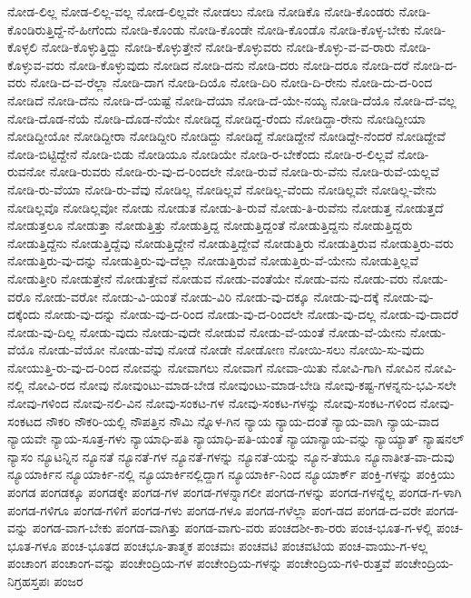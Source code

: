 ನೋಡ-ಲಿಲ್ಲ
ನೋಡ-ಲಿಲ್ಲ-ವಲ್ಲ
ನೋಡ-ಲಿಲ್ಲವೇ
ನೋಡಲು
ನೋಡಿ
ನೋಡಿಕೊ
ನೋಡಿ-ಕೊಂಡರು
ನೋಡಿ-ಕೊಂಡಿರುತ್ತಿದ್ದೆ-ನೆ-ಹೀಗೆಂದು
ನೋಡಿ-ಕೊಂಡು
ನೋಡಿ-ಕೊಂಡೇ
ನೋಡಿ-ಕೊಂಡೊ
ನೋಡಿ-ಕೊಳ್ಳ-ಬೇಕು
ನೋಡಿ-ಕೊಳ್ಳಲಿ
ನೋಡಿ-ಕೊಳ್ಳುತ್ತಿದ್ದು
ನೋಡಿ-ಕೊಳ್ಳುತ್ತೇನೆ
ನೋಡಿ-ಕೊಳ್ಳುವರು
ನೋಡಿ-ಕೊಳ್ಳು-ವ-ವ-ರಾರು
ನೋಡಿ-ಕೊಳ್ಳುವ-ವರು
ನೋಡಿ-ಕೊಳ್ಳುವುದು
ನೋಡಿದ
ನೋಡಿ-ದನು
ನೋಡಿ-ದರು
ನೋಡಿ-ದರೂ
ನೋಡಿ-ದರೆ
ನೋಡಿ-ದ-ವರು
ನೋಡಿ-ದ-ವ-ರೆಲ್ಲಾ
ನೋಡಿ-ದಾಗ
ನೋಡಿ-ದಿಯೊ
ನೋಡಿ-ದಿರಿ
ನೋಡಿ-ದಿ-ರೇನು
ನೋಡಿ-ದು-ದ-ರಿಂದ
ನೋಡಿದೆ
ನೋಡಿ-ದೆನು
ನೋಡಿ-ದೆ-ಯಷ್ಟೆ
ನೋಡಿ-ದೆಯಾ
ನೋಡಿ-ದೆ-ಯೇ-ನಯ್ಯ
ನೋಡಿ-ದೆಯೊ
ನೋಡಿ-ದೆ-ವಲ್ಲ
ನೋಡಿ-ದೊಡ-ನೆಯೆ
ನೋಡಿ-ದೊಡ-ನೆಯೇ
ನೋಡಿದ್ದ
ನೋಡಿದ್ದ-ರೆಂದು
ನೋಡಿದ್ದಾ-ರೇನು
ನೋಡಿದ್ದೀಯಾ
ನೋಡಿದ್ದೀಯೋ
ನೋಡಿದ್ದೀರಾ
ನೋಡಿದ್ದೀರಿ
ನೋಡಿದ್ದು
ನೋಡಿದ್ದೆ
ನೋಡಿದ್ದೇನೆ
ನೋಡಿದ್ದೇ-ನೆಂದರೆ
ನೋಡಿದ್ದೇವೆ
ನೋಡಿ-ಬಿಟ್ಟಿದ್ದೇನೆ
ನೋಡಿ-ಬಿಡು
ನೋಡಿಯೂ
ನೋಡಿಯೇ
ನೋಡಿ-ರ-ಬೇಕೆಂದು
ನೋಡಿ-ರ-ಲಿಲ್ಲವೆ
ನೋಡಿ-ರುವನೋ
ನೋಡಿ-ರುವರು
ನೋಡಿ-ರು-ವು-ದ-ರಿಂದಲೇ
ನೋಡಿ-ರುವೆ
ನೋಡಿ-ರು-ವೆನು
ನೋಡಿ-ರುವೆ-ಯಲ್ಲವೆ
ನೋಡಿ-ರು-ವೆಯಾ
ನೋಡಿ-ರು-ವೆವು
ನೋಡಿಲ್ಲ
ನೋಡಿಲ್ಲವೆ
ನೋಡಿಲ್ಲ-ವೆಂದು
ನೋಡಿಲ್ಲವೇ
ನೋಡಿಲ್ಲ-ವೇನು
ನೋಡಿಲ್ಲವೊ
ನೋಡಿಲ್ಲವೋ
ನೋಡು
ನೋಡುತ
ನೋಡು-ತಿ-ರುವೆ
ನೋಡು-ತಿ-ರುವೆನು
ನೋಡುತ್ತ
ನೋಡುತ್ತದೆ
ನೋಡುತ್ತಲೂ
ನೋಡುತ್ತಾ
ನೋಡುತ್ತಿತ್ತು
ನೋಡುತ್ತಿದ್ದ
ನೋಡುತ್ತಿದ್ದಂತೆ
ನೋಡುತ್ತಿದ್ದನು
ನೋಡುತ್ತಿದ್ದರು
ನೋಡುತ್ತಿದ್ದೆನು
ನೋಡುತ್ತಿದ್ದೆವು
ನೋಡುತ್ತಿದ್ದೇನೆ
ನೋಡುತ್ತಿದ್ದೇವೆ
ನೋಡುತ್ತಿರು
ನೋಡುತ್ತಿರುವ
ನೋಡುತ್ತಿರು-ವರು
ನೋಡುತ್ತಿರು-ವು-ದನ್ನು
ನೋಡುತ್ತಿರು-ವು-ದೆಲ್ಲಾ
ನೋಡುತ್ತಿರುವೆ
ನೋಡುತ್ತಿರು-ವೆ-ಯೇನು
ನೋಡುತ್ತಿಲ್ಲವೆ
ನೋಡುತ್ತೀರಿ
ನೋಡುತ್ತೇನೆ
ನೋಡುತ್ತೇವೆ
ನೋಡುವ
ನೋಡು-ವಂತೆಯೇ
ನೋಡು-ವನು
ನೋಡು-ವರು
ನೋಡು-ವರೊ
ನೋಡು-ವರೋ
ನೋಡು-ವಿ-ಯಂತೆ
ನೋಡು-ವಿರಿ
ನೋಡು-ವು-ದಕ್ಕೂ
ನೋಡು-ವು-ದಕ್ಕೆ
ನೋಡು-ವು-ದಕ್ಕೆಂದು
ನೋಡು-ವು-ದನ್ನು
ನೋಡು-ವು-ದ-ರಿಂದ
ನೋಡು-ವು-ದ-ರಿಂದಲೇ
ನೋಡು-ವು-ದಲ್ಲ
ನೋಡು-ವು-ದಾದರೆ
ನೋಡು-ವು-ದಿಲ್ಲ
ನೋಡು-ವುದು
ನೋಡು-ವುದೇ
ನೋಡುವೆ
ನೋಡು-ವೆ-ಯಂತೆ
ನೋಡು-ವೆ-ಯೇನು
ನೋಡು-ವೆಯೊ
ನೋಡು-ವೆಯೋ
ನೋಡು-ವೆವು
ನೋಡೆ
ನೋಡೇ
ನೋಡೋಣ
ನೋಯಿ-ಸಲು
ನೋಯಿ-ಸು-ವುದು
ನೋಯುತ್ತಿ-ರು-ವು-ದ-ರಿಂದ
ನೋವನ್ನು
ನೋವಾಗಲು
ನೋವಾಗೆ
ನೋವಾ-ಯಿತು
ನೋವಿ-ಗಾಗಿ
ನೋವಿನ
ನೋವಿ-ನಲ್ಲಿ
ನೋವಿ-ರದ
ನೋವು
ನೋವುಂಟು-ಮಾಡ-ಬೇಡ
ನೋವುಂಟು-ಮಾಡ-ಬೇಡಿ
ನೋವು-ಕಷ್ಟ-ಗಳನ್ನನು-ಭವಿ-ಸಲೇ
ನೋವು-ಗಳಿಂದ
ನೋವು-ನಲಿ-ವಿನ
ನೋವು-ಸಂಕಟ-ಗಳ
ನೋವು-ಸಂಕಟ-ಗಳನ್ನು
ನೋವು-ಸಂಕಟ-ಗಳಿಂದ
ನೋವು-ಸಂಕಟದ
ನೌಕರಿ
ನೌಕರಿ-ಯಲ್ಲಿ
ನೌಪತ್ತಿನ
ನೌಮಿ
ನ್ನೊಳ-ಗಿನ
ನ್ಯಾಯ
ನ್ಯಾಯ-ದಂತೆ
ನ್ಯಾಯ-ವಾಗಿ
ನ್ಯಾಯ-ವಾದ
ನ್ಯಾಯವೇ
ನ್ಯಾಯ-ಸೂತ್ರ-ಗಳು
ನ್ಯಾಯಾಧಿ-ಪತಿ
ನ್ಯಾಯಾಧಿ-ಪತಿ-ಯಂತೆ
ನ್ಯಾಯಾನ್ಯಾಯ-ವನ್ನು
ನ್ಯಾಯ್ಯಾತ್
ನ್ಯಾಷನಲ್
ನ್ಯಾಸಂ
ನ್ಯೂಟನ್ನಿನ
ನ್ಯೂನತೆ
ನ್ಯೂನತೆ-ಗಳ
ನ್ಯೂನತೆ-ಗಳನ್ನು
ನ್ಯೂನತೆ-ಯನ್ನು
ನ್ಯೂನ-ತೆಯೂ
ನ್ಯೂನಾತೀತ-ವಾ-ದುವು
ನ್ಯೂಯಾರ್ಕಿನ
ನ್ಯೂಯಾರ್ಕಿ-ನಲ್ಲಿ
ನ್ಯೂಯಾರ್ಕಿನಲ್ಲಿದ್ದಾಗ
ನ್ಯೂಯಾರ್ಕಿ-ನಿಂದ
ನ್ಯೂಯಾರ್ಕ್
ಪಂಕ್ತಿ-ಗಳನ್ನು
ಪಂಕ್ತಿಯು
ಪಂಗಡ
ಪಂಗಡಕ್ಕೂ
ಪಂಗಡಕ್ಕೇ
ಪಂಗಡ-ಗಳ
ಪಂಗಡ-ಗಳನ್ನಾಗಲೀ
ಪಂಗಡ-ಗಳನ್ನು
ಪಂಗಡ-ಗಳನ್ನೆಲ್ಲ
ಪಂಗಡ-ಗ-ಳಾಗಿ
ಪಂಗಡ-ಗಳಿಗೂ
ಪಂಗಡ-ಗಳಿಗೆ
ಪಂಗಡ-ಗಳು
ಪಂಗಡ-ಗಳೂ
ಪಂಗಡ-ಗಳೆಲ್ಲಾ
ಪಂಗ-ಡದ
ಪಂಗಡ-ದ-ವರೇ
ಪಂಗಡ-ವನ್ನು
ಪಂಗಡ-ವಾಗ-ಬೇಕು
ಪಂಗಡ-ವಾಗಿತ್ತು
ಪಂಗಡ-ವಾಗು-ವರು
ಪಂಚದಶೀ-ಕಾ-ರರು
ಪಂಚ-ಭೂತ-ಗ-ಳಲ್ಲಿ
ಪಂಚ-ಭೂತ-ಗಳೂ
ಪಂಚ-ಭೂತದ
ಪಂಚಭೂ-ತಾತ್ಮಕ
ಪಂಚಮಃ
ಪಂಚವಟಿ
ಪಂಚವಟಿಯ
ಪಂಚ-ವಾಯು-ಗ-ಳಲ್ಲ
ಪಂಚಾಂಗ
ಪಂಚಾಂಗ-ವನ್ನು
ಪಂಚೇಂದ್ರಿಯ-ಗಳ
ಪಂಚೇಂದ್ರಿಯ-ಗಳನ್ನು
ಪಂಚೇಂದ್ರಿಯ-ಗಳಿ-ರುತ್ತವೆ
ಪಂಚೇಂದ್ರಿಯ-ನಿಗ್ರಹಸ್ತಪಃ
ಪಂಜರ
